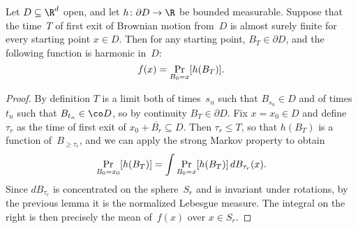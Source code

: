 \begin	{theorem}
Let \( D \subseteq \R^d \) open,
and let \( h \colon \partial D \to \R \) be bounded measurable.
Suppose that the time~$T$ of first exit of Brownian motion from~$D$
is almost surely finite for every starting point \( x \in D \).
Then for any starting point, \( B_T \in \partial D \),
and the following function is harmonic in~$D$:
\begin	{equation}
\label	{eq:laplace-solution}
	f(x) = \Pr_{B_0 = x}[h(B_T)] \text.
\end	{equation}
\end	{theorem}
\begin	{proof}
By definition $T$ is a limit
both of times~$s_n$ such that \( B_{s_n} \in D \)
and of times~$t_n$ such that \( B_{t_n} \in \co D \),
so by continuity \( B_T \in \partial D \).
Fix \( x = x_0 \in D \) and define \( \tau_r \)
as the time of first exit of \( x_0 + \overline{B_r} \subseteq D \).
Then \( \tau_r \le T \),
so that $h(B_T)$ is a function of~$B_{\ge\tau_r}$,
and we can apply the strong Markov property to obtain
\[ \Pr_{B_0 = x_0}[h(B_T)]
	= \int \Pr_{B_0 = x}[h(B_T)] \,dB_{\tau_r}(x)
	\text. \]
Since $dB_{\tau_r}$ is concentrated on the sphere~$S_r$
and is invariant under rotations,
by the previous lemma it is the normalized Lebesgue measure.
The integral on the right is then precisely the mean of~$f(x)$
over \( x \in S_r \).
\end	{proof}
